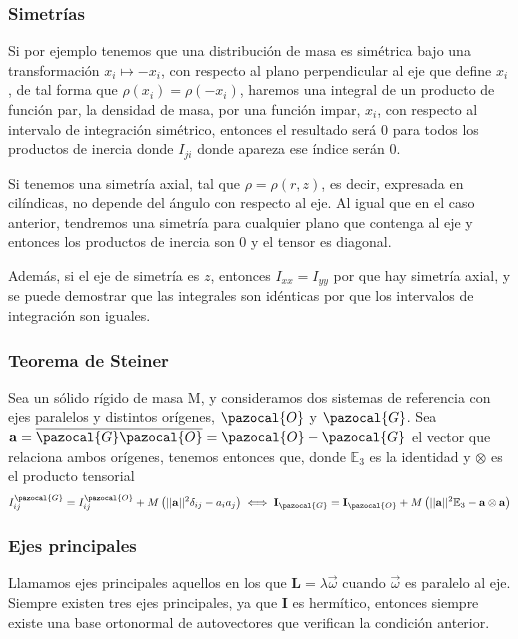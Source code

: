 \subsubsection{Simetrías}
Si por ejemplo tenemos que una distribución de masa es simétrica bajo una transformación $x_i \mapsto -x_i$, con respecto al plano perpendicular al eje que define $x_i$, de tal forma que $\rho(x_i) = \rho(-x_i)$, haremos una integral de un producto de función par, la densidad de masa, por una función impar, $x_i$, con respecto al intervalo de integración simétrico, entonces el resultado será 0 para todos los productos de inercia donde $I_{ji}$ donde apareza ese índice serán 0.

Si tenemos una simetría axial, tal que $\rho = \rho(r,z)$, es decir, expresada en cilíndicas, no depende del ángulo con respecto al eje. Al igual que en el caso anterior, tendremos una simetría para cualquier plano que contenga al eje y entonces los productos de inercia son 0 y el tensor es diagonal.

Además, si el eje de simetría es $z$, entonces $I_{xx} = I_{yy}$ por que hay simetría axial, y se puede demostrar que las integrales son idénticas por que los intervalos de integración son iguales.
\subsubsection{Teorema de Steiner}
Sea un sólido rígido de masa M, y consideramos dos sistemas de referencia con ejes paralelos y distintos orígenes, $\pazocal{O}$ y $\pazocal{G}$. Sea $\mathbf{a} = \overline{\pazocal{G}\pazocal{O}} = \pazocal{O}-\pazocal{G}$ el vector que relaciona ambos orígenes, tenemos entonces que, donde $\mathbb{E}_3$ es la identidad y $\otimes$ es el producto tensorial
\begin{equation} \label{6.1.1}
    I^\pazocal{G}_{ij} = I^\pazocal{O}_{ij} + M\left(||\mathbf{a}||^2 \delta_{ij} -a_i a_j\right) \iff \mathbf{I}_\pazocal{G} = \mathbf{I}_\pazocal{O} + M\left(||\mathbf{a}||^2 \mathbb{E}_3-\mathbf{a} \otimes \mathbf{a}\right)
\end{equation} 
\vspace{-20pt}
\subsubsection{Ejes principales}
Llamamos ejes principales aquellos en los que $\mathbf{L} = \lambda \vec{\omega}$ cuando $\vec{\omega}$ es paralelo al eje.
Siempre existen tres ejes principales, ya que $\mathbf{I}$ es hermítico, entonces siempre existe una base ortonormal de autovectores que verifican la condición anterior.
